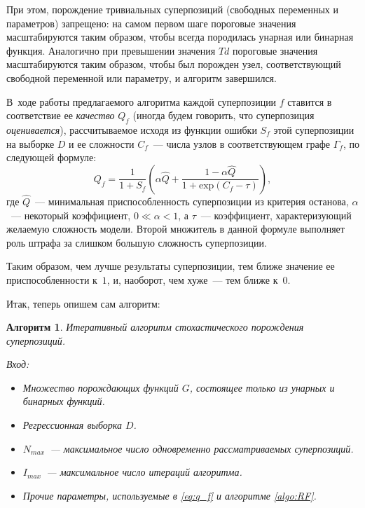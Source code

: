 \documentclass[12pt,a4paper]{article}
\newtheorem{algo}{Алгоритм}
\begin{document}
При этом, порождение тривиальных суперпозиций (свободных переменных и
параметров) запрещено: на самом первом шаге пороговые значения масштабируются
таким образом, чтобы всегда породилась унарная или бинарная функция.
Аналогично при превышении значения $Td$ пороговые значения масштабируются
таким образом, чтобы был порожден узел, соответствующий свободной переменной
или параметру, и алгоритм завершился.

В~ходе работы предлагаемого алгоритма каждой суперпозиции $f$ ставится в
соответствие ее \emph{качество} $Q_f$ (иногда будем говорить, что
суперпозиция \emph{оценивается}), рассчитываемое исходя из функции ошибки
$S_f$ этой суперпозиции на выборке $D$ и ее сложности $C_f$~---
числа узлов в соответствующем графе $\Gamma_f$, по следующей формуле:
\begin{equation}
  \label{eq:q_f}
  Q_f = \frac{1}{1 + S_f} \left(\alpha \hat{Q} + \frac{1 - \alpha \hat{Q}}{1 + \text{exp} (C_f - \tau)}\right),
\end{equation}
где $\hat{Q}$~--- минимальная приспособленность суперпозиции из критерия
останова, $\alpha$~--- некоторый коэффициент, $0 \ll \alpha < 1$, а
$\tau$~--- коэффициент, характеризующий желаемую сложность модели.
Второй множитель в данной формуле выполняет роль штрафа за слишком
большую сложность суперпозиции.

Таким образом, чем лучше результаты суперпозиции, тем ближе значение ее
приспособленности к~$1$, и, наоборот, чем хуже~--- тем ближе к~$0$.

Итак, теперь опишем сам алгоритм:
\begin{algo}
  \label{algo:SA}
  Итеративный алгоритм стохастического порождения суперпозиций.

  Вход:
  \begin{itemize}
	\item Множество порождающих функций $G$, состоящее только из унарных
	  и бинарных функций.
	\item Регрессионная выборка $D$.
	\item $N_{max}$~--- максимальное число одновременно рассматриваемых
	  суперпозиций.
	\item $I_{max}$~--- максимальное число итераций алгоритма.
	\item Прочие параметры, используемые в \eqref{eq:q_f} и алгоритме
	  \ref{algo:RF}.
  \end{itemize}
\end{algo}
\end{document}
